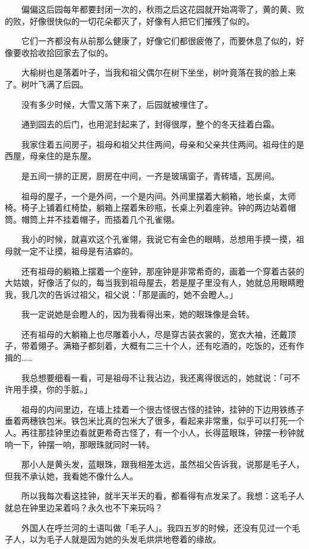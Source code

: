 \documentclass[UTF8]{ctexart}
\begin{document}
　　偏偏这后园每年都要封闭一次的，秋雨之后这花园就开始凋零了，黄的黄、败的败，好像很快似的一切花朵都灭了，好像有人把它们摧残了似的。

　　它们一齐都没有从前那么健康了，好像它们都很疲倦了，而要休息了似的，好像要收拾收拾回家去了似的。

　　大榆树也是落着叶子，当我和祖父偶尔在树下坐坐，树叶竟落在我的脸上来了。树叶飞满了后园。

　　没有多少时候，大雪又落下来了，后园就被埋住了。

　　通到园去的后门，也用泥封起来了，封得很厚，整个的冬天挂着白霜。

　　我家住着五间房子，祖母和祖父共住两间，母亲和父亲共住两间。祖母住的是西屋，母亲住的是东屋。

　　是五间一排的正房，厨房在中间，一齐是玻璃窗子，青砖墙，瓦房间。

　　祖母的屋子，一个是外间，一个是内间。外间里摆着大躺箱，地长桌，太师椅。椅子上铺着红椅垫，躺箱上摆着朱砂瓶，长桌上列着座钟。钟的两边站着帽筒。帽筒上并不挂着帽子，而插着几个孔雀翎。

　　我小的时候，就喜欢这个孔雀翎，我说它有金色的眼睛，总想用手摸一摸，祖母就一定不让摸，祖母是有洁癖的。

　　还有祖母的躺箱上摆着一个座钟，那座钟是非常希奇的，画着一个穿着古装的大姑娘，好像活了似的，每当我到祖母屋去，若是屋子里没有人，她就总用眼睛瞪我，我几次的告诉过祖父，祖父说：「那是画的，她不会瞪人。」

　　我一定说她是会瞪人的，因为我看得出来，她的眼珠像是会转。

　　还有祖母的大躺箱上也尽雕着小人，尽是穿古装衣裳的，宽衣大袖，还戴顶子，带着翎子。满箱子都刻着，大概有二三十个人，还有吃酒的，吃饭的，还有作揖的……

　　我总想要细看一看，可是祖母不让我沾边，我还离得很远的，她就说：「可不许用手摸，你的手脏。」

　　祖母的内间里边，在墙上挂着一个很古怪很古怪的挂钟，挂钟的下边用铁练子垂着两穗铁包米。铁包米比真的包米大了很多，看起来非常重，似乎可以打死一个人。再往那挂钟里边看就更希奇古怪了，有一个小人，长得蓝眼珠，钟摆一秒钟就响一下，钟摆一响，那眼珠就同时一转。

　　那小人是黄头发，蓝眼珠，跟我相差太远，虽然祖父告诉我，说那是毛子人，但我不承认她，我看她不像什么人。

　　所以我每次看这挂钟，就半天半天的看，都看得有点发呆了。我想：这毛子人就总在钟里边呆着吗？永久也不下来玩吗？

　　外国人在呼兰河的土语叫做「毛子人」。我四五岁的时候，还没有见过一个毛子人，以为毛子人就是因为她的头发毛烘烘地卷着的缘故。
\end{document}
